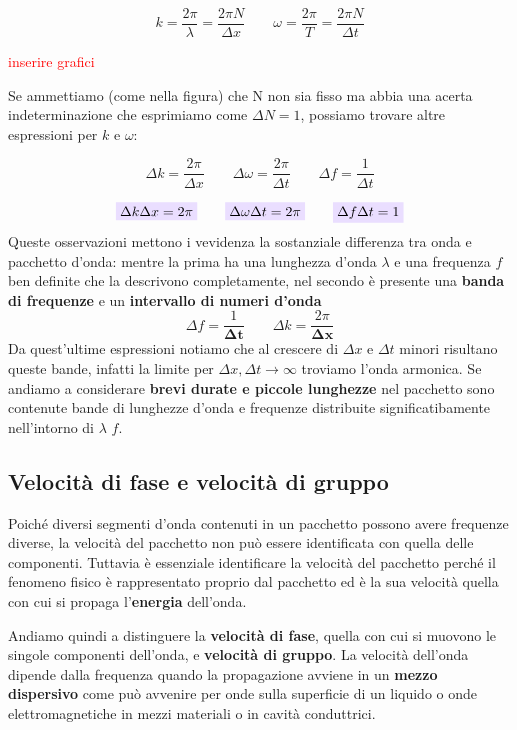 \documentclass[x11names]{report}
\newcommand{\viola}[1]{\colorbox{yred}{$\displaystyle #1$}}
\begin{document}
	\[ 
	k = \frac{2\pi}{\lambda}= \frac{2\pi N}{\Delta x} \qquad \omega = \frac{2\pi}{T} = \frac{2\pi N}{\Delta t}
	\]
	
	\begin{center}
		\textcolor{red}{inserire grafici}
	\end{center}
	Se ammettiamo (come nella figura) che N non sia fisso ma abbia una acerta indeterminazione che esprimiamo come \(\Delta N = 1\), possiamo trovare altre espressioni per \(k\) e \(\omega\):
	
	\[ 
	\boxed{\Delta k = \frac{2\pi}{\Delta x}} \qquad \boxed{ \Delta\omega = \frac{2\pi}{\Delta t}} \qquad \boxed{\Delta f = \frac{1}{\Delta t}}
	\]
	
	\[ 
	\viola{\Delta k \Delta x = 2\pi} \qquad \viola{\Delta \omega \Delta t = 2\pi} \qquad \viola{\Delta f \Delta t = 1}
	\]
	Queste osservazioni mettono i vevidenza la sostanziale differenza tra onda e pacchetto d'onda: mentre la prima ha una lunghezza d'onda \(\lambda\)  e una frequenza \(f\) ben definite che la descrivono completamente, nel secondo è presente una \textbf{banda di frequenze} e un \textbf{intervallo di numeri d'onda}
	\[ 
	\Delta f = \frac{1}{\boldsymbol{\Delta t}} \qquad \Delta k = \frac{2\pi}{\boldsymbol{\Delta x}}
	\]
	Da quest'ultime espressioni notiamo che al crescere di \(\Delta x\) e \(\Delta t\) minori risultano queste bande, infatti la limite per \(\Delta x,\Delta t \to \infty\) troviamo l'onda armonica. Se andiamo a considerare \textbf{brevi durate e piccole lunghezze} nel pacchetto sono contenute bande di lunghezze d'onda e frequenze distribuite significatibamente nell'intorno di \(\lambda\) \(f\).
	
		\subsection{Velocità di fase e velocità di gruppo}
		Poiché diversi segmenti d'onda contenuti in un pacchetto possono avere frequenze diverse, la velocità del pacchetto non può essere identificata con quella delle componenti. Tuttavia è essenziale identificare la velocità del pacchetto perché il fenomeno fisico è rappresentato proprio dal pacchetto ed è la sua velocità quella con cui si propaga l'\textbf{energia} dell'onda.     
		
		Andiamo quindi a distinguere la \textbf{velocità di fase}, quella con cui si muovono le singole componenti dell'onda, e \textbf{velocità di gruppo}. 
		La velocità dell'onda dipende dalla frequenza quando la propagazione avviene in un \textbf{mezzo dispersivo} come può avvenire per onde sulla superficie di un liquido o onde elettromagnetiche in mezzi materiali o in cavità conduttrici.\\
		
\end{document}
